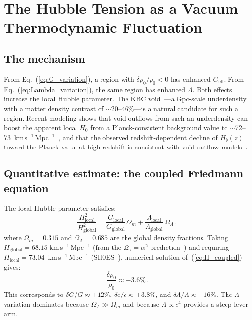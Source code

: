 \documentclass[12pt, a4paper]{article}
\newcommand{\Geff}{G_{\mathrm{eff}}}
\begin{document}
\section{The Hubble Tension as a Vacuum Thermodynamic Fluctuation}
\label{sec:hubble_tension}

\subsection{The mechanism}

From Eq.~(\ref{eq:G_variation}), a region with $\delta\rho_0/\rho_0 < 0$ has enhanced $\Geff$. From Eq.~(\ref{eq:Lambda_variation}), the same region has enhanced $\Lambda$. Both effects increase the local Hubble parameter. The KBC void~\cite{keenan_2013,whitbourn_2016}---a Gpc-scale underdensity with a matter density contrast of $\sim 20$--$46\%$---is a natural candidate for such a region. Recent modeling shows that void outflows from such an underdensity can boost the apparent local $H_0$ from a Planck-consistent background value to $\sim$72--73~km\,s$^{-1}$\,Mpc$^{-1}$~\cite{haslbauer_2020}, and that the observed redshift-dependent decline of $H_0(z)$ toward the Planck value at high redshift is consistent with void outflow models~\cite{mazurenko_2025}.

\subsection{Quantitative estimate: the coupled Friedmann equation}

The local Hubble parameter satisfies:
\begin{equation}
    \frac{H_{\mathrm{local}}^2}{H_{\mathrm{global}}^2} = \frac{G_{\mathrm{local}}}{G_{\mathrm{global}}}\,\Omega_m + \frac{\Lambda_{\mathrm{local}}}{\Lambda_{\mathrm{global}}}\,\Omega_\Lambda\,,
\label{eq:H_coupled}
\end{equation}
where $\Omega_m = 0.315$ and $\Omega_\Lambda = 0.685$ are the global density fractions. Taking
$H_{\mathrm{global}} = 68.15$ km\,s$^{-1}$\,Mpc$^{-1}$ (from the $\Omega_\gamma = \alpha^2$ prediction~\cite{kulangiev_2026o}) and requiring $H_{\mathrm{local}} = 73.04$~km\,s$^{-1}$\,Mpc$^{-1}$ (SH0ES~\cite{riess_2022}), numerical solution of~(\ref{eq:H_coupled}) gives:
\begin{equation}
    \frac{\delta\rho_0}{\rho_0} \approx -3.6\%\,.
\label{eq:delta_rho_required}
\end{equation}
This corresponds to $\delta G/G \approx +12\%$, $\delta c/c \approx +3.8\%$, and $\delta\Lambda/\Lambda \approx +16\%$. The $\Lambda$ variation dominates because $\Omega_\Lambda \gg \Omega_m$ and because $\Lambda \propto c^4$ provides a steep lever arm.
\end{document}
